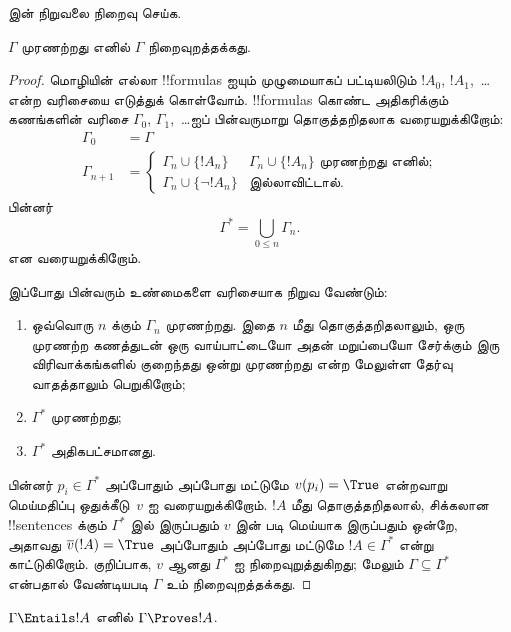 \documentclass[11pt,a4paper,openany]{memoir}
\begin{document}
\begin{prob}
   இன் நிறுவலை நிறைவு செய்க.
\end{prob}

\begin{thm}[நிறைவுத்தன்மை]
$\Gamma$ முரணற்றது எனில் $\Gamma$ நிறைவுறத்தக்கது.
\end{thm}

\begin{proof}
மொழியின் எல்லா !!{formula}s ஐயும் முழுமையாகப்
பட்டியலிடும் $!A_0$, $!A_1$,~\dots என்ற வரிசையை
எடுத்துக் கொள்வோம். !!{formula}s கொண்ட
அதிகரிக்கும் கணங்களின் வரிசை $\Gamma_0$,
$\Gamma_1$,~\dots ஐப் பின்வருமாறு தொகுத்தறிதலாக
வரையறுக்கிறோம்:
\begin{align*}
\Gamma_0 & = \Gamma\\
\Gamma_{n+1} &  =
\begin{cases}
  \Gamma_n \cup \{!A_n\} & \text{$\Gamma_n \cup \{!A_n\}$ முரணற்றது எனில்;}\\
  \Gamma_n \cup \{\lnot !A_n\} & \text{இல்லாவிட்டால்}.
\end{cases}
\end{align*}
பின்னர்
\[
\Gamma^* = \bigcup_{0\le n}\Gamma_n.
\]
என வரையறுக்கிறோம்.

இப்போது பின்வரும் உண்மைகளை வரிசையாக நிறுவ வேண்டும்:
\begin{enumerate}
\item ஒவ்வொரு $n$ க்கும் $\Gamma_n$ முரணற்றது.
  இதை $n$ மீது தொகுத்தறிதலாலும், ஒரு முரணற்ற
  கணத்துடன் ஒரு வாய்பாட்டையோ அதன் மறுப்பையோ
  சேர்க்கும் இரு விரிவாக்கங்களில் குறைந்தது ஒன்று
  முரணற்றது என்ற மேலுள்ள தேர்வு வாதத்தாலும் பெறுகிறோம்;
\item $\Gamma^*$ முரணற்றது;
\item $\Gamma^*$ அதிகபட்சமானது.
\end{enumerate}
பின்னர் $p_i \in \Gamma^*$ அப்போதும் அப்போது
மட்டுமே $v(p_i) = \True$ என்றவாறு மெய்மதிப்பு
ஒதுக்கீடு~$v$ ஐ வரையறுக்கிறோம். $!A$ மீது
தொகுத்தறிதலால், சிக்கலான !!{sentence}s க்கும்
$\Gamma^*$ இல் இருப்பதும் $v$ இன் படி மெய்யாக
இருப்பதும் ஒன்றே, அதாவது
$\overline{v}(!A) = \True$ அப்போதும் அப்போது
மட்டுமே $!A \in \Gamma^*$ என்று காட்டுகிறோம்.
குறிப்பாக, $v$ ஆனது $\Gamma^*$ ஐ நிறைவுறுத்துகிறது;
மேலும் $\Gamma \subseteq \Gamma^*$ என்பதால்
வேண்டியபடி $\Gamma$ உம் நிறைவுறத்தக்கது.
\end{proof}

\begin{cor}
$\Gamma \Entails !A$ எனில் $\Gamma \Proves !A$.
\end{cor}
\end{document}
